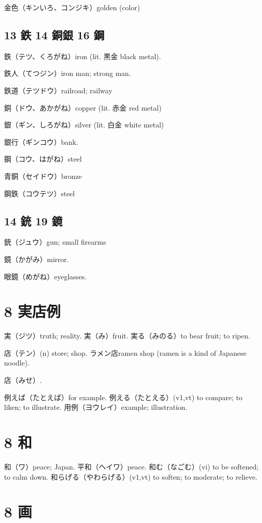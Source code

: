 金色（キンいろ、コンジキ）golden (color)

\subsection{13 鉄 14 銅銀 16 鋼}

鉄（テツ、くろがね）iron (lit. 黒金 black metal).

鉄人（てつジン）iron man; strong man.

鉄道（テツドウ）railroad; railway

銅（ドウ、あかがね）copper (lit. 赤金 red metal)

銀（ギン、しろがね）silver (lit. 白金 white metal)

銀行（ギンコウ）bank.

鋼（コウ、はがね）steel

青銅（セイドウ）bronze

鋼鉄（コウテツ）steel

\subsection{14 銃 19 鏡}

銃（ジュウ）gun; small firearms

鏡（かがみ）mirror.

眼鏡（めがね）eyeglasses.

\section{8 実店例}

実（ジツ）truth; reality.
実（み）fruit.
実る（みのる）to bear fruit; to ripen.

店（テン）(n) store; shop.
ラメン店ramen shop (ramen is a kind of Japanese noodle).

店（みせ）.

例えば（たとえば）for example.
例える（たとえる）(v1,vt)
to compare; to liken; to illustrate.
用例（ヨウレイ）example; illustration.

\section{8 和}

和（ワ）peace; Japan.
平和（ヘイワ）peace.
和む（なごむ）(vi) to be softened; to calm down.
和らげる（やわらげる）(v1,vt) to soften; to moderate; to relieve.

\section{8 画}

